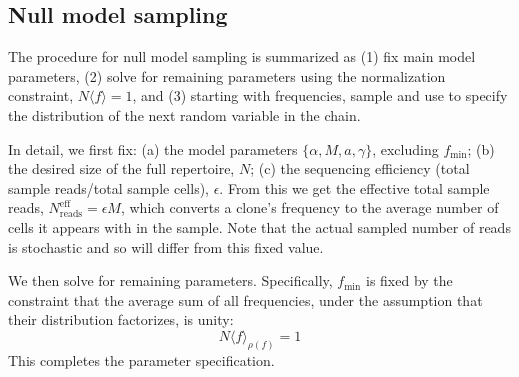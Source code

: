 \documentclass[pre,twocolumn,english,longbibliography]{revtex4}
\newcommand{\<}{\langle}
\renewcommand{\>}{\rangle}
\begin{document}
\subsection*{Null model sampling}\label{sec:null_sampling}
The procedure for null model sampling is summarized as (1) fix main model parameters, (2) solve for remaining parameters using the normalization constraint, $N \langle f \rangle=1$, and (3) starting with frequencies, sample and use to specify the distribution of the next random variable in the chain.

In detail, we first fix: (a)
the model parameters $\{\alpha,M,a,\gamma\}$, excluding $f_{\textrm{min}}$;
(b) the desired size of the full repertoire, $N$;
(c) the sequencing efficiency (total sample reads/total sample cells), $\epsilon$. From this we get the effective total sample reads, $N^{\textrm{eff}}_{\textrm{reads}}=\epsilon M$, which converts a clone's frequency to the average number of cells it appears with in the sample.
Note that the actual sampled number of reads is stochastic and so will differ from this fixed value.

We then solve for remaining parameters. Specifically, $f_{\textrm{min}}$ is fixed by the constraint that the average sum of all frequencies, under the assumption that their distribution factorizes, is unity:
\begin{equation}
	N \langle f\rangle_{\rho(f)}=1
\end{equation}
This completes the parameter specification.
\end{document}
